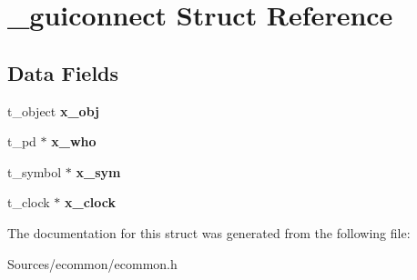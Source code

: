 \hypertarget{struct__guiconnect}{\section{\-\_\-guiconnect Struct Reference}
\label{struct__guiconnect}
}
\subsection*{Data Fields}
\begin{DoxyCompactItemize}
\item 
\hypertarget{struct__guiconnect_aec9b618f42517cd6740f1d37dba87d0a}{t\-\_\-object {\bfseries x\-\_\-obj}}\label{struct__guiconnect_aec9b618f42517cd6740f1d37dba87d0a}

\item 
\hypertarget{struct__guiconnect_abbd575f25ecf1fc4fc706f487f7bf433}{t\-\_\-pd $\ast$ {\bfseries x\-\_\-who}}\label{struct__guiconnect_abbd575f25ecf1fc4fc706f487f7bf433}

\item 
\hypertarget{struct__guiconnect_aac75f326262b21717e7625275550a9cc}{t\-\_\-symbol $\ast$ {\bfseries x\-\_\-sym}}\label{struct__guiconnect_aac75f326262b21717e7625275550a9cc}

\item 
\hypertarget{struct__guiconnect_a959680d1c5640f1e34e835dda3021eef}{t\-\_\-clock $\ast$ {\bfseries x\-\_\-clock}}\label{struct__guiconnect_a959680d1c5640f1e34e835dda3021eef}

\end{DoxyCompactItemize}


The documentation for this struct was generated from the following file\-:\begin{DoxyCompactItemize}
\item 
Sources/ecommon/ecommon.\-h\end{DoxyCompactItemize}
